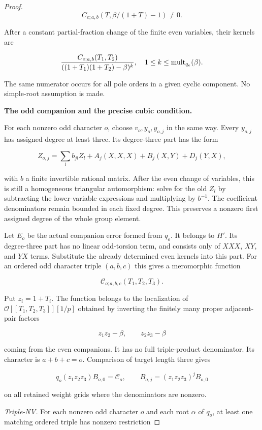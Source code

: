 \documentclass[11pt,a4paper]{article}
\theoremstyle{definition}
\begin{document}
\begin{proof}
\[
C_{e;a,b}(T,\beta/(1+T)-1)\ne0.
\]

After a constant partial-fraction change of the finite even variables, their kernels are

\[
\frac{C_{e;a,b}(T_1,T_2)}
 {((1+T_1)(1+T_2)-\beta)^k},
\quad 1\le k\le {\rm mult}_{q_e}(\beta).
\]

The same numerator occurs for all pole orders in a given cyclic component. No simple-root assumption is made.

\par\medskip\noindent\textbf{The odd companion and the precise cubic condition.}

For each nonzero odd character \(o\), choose \(v_o,y_o,y_{o,j}\) in the same way. Every \(y_{o,j}\) has assigned degree at least three. Its degree-three part has the form

\[
Z_{o,j}=\sum_l b_{jl}Z_l+
  A_j(X,X,X)+B_j(X,Y)+D_j(Y,X),
\]

with \(b\) a finite invertible rational matrix. After the even change of variables, this is still a homogeneous triangular automorphism: solve for the old \(Z_l\) by subtracting the lower-variable expressions and multiplying by \(b^{-1}\). The coefficient denominators remain bounded in each fixed degree. This preserves a nonzero first assigned degree of the whole group element.

Let \(E_o\) be the actual companion error formed from \(q_o\). It belongs to \(H'\). Its degree-three part has no linear odd-torsion term, and consists only of \(XXX\), \(XY\), and \(YX\) terms. Substitute the already determined even kernels into this part. For an ordered odd character triple \((a,b,c)\) this gives a meromorphic function

\[
\mathcal C_{o;a,b,c}(T_1,T_2,T_3).
\]

Put \(z_i=1+T_i\). The function belongs to the localization of
\(\mathcal O[[T_1,T_2,T_3]][1/p]\) obtained by inverting the finitely many proper adjacent-pair factors

\[
z_1z_2-\beta,\qquad z_2z_3-\beta
\]

coming from the even companions. It has no full triple-product denominator. Its character is \(a+b+c=o\). Comparison of target length three gives

\[
q_o(z_1z_2z_3)B_{o,0}=\mathcal C_o,\qquad
B_{o,j}=(z_1z_2z_3)^jB_{o,0}
\]

on all retained weight grids where the denominators are nonzero.

\emph{Triple-NV.} For each nonzero odd character \(o\) and each root \(\alpha\) of \(q_o\), at least one matching ordered triple has nonzero restriction


\end{proof}
\end{document}
